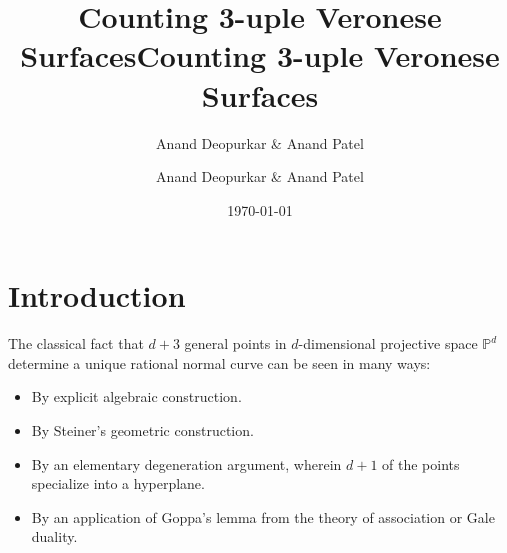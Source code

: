 \documentclass{article}
\author{Anand Deopurkar \& Anand Patel}
\title{Counting 3-uple Veronese Surfaces}
\date{\today}
\title{Counting 3-uple Veronese Surfaces}
\author{Anand Deopurkar \& Anand Patel}
\renewcommand{\P}{\mathbb{P}}
\begin{document}
\maketitle

\maketitle

\section{Introduction} 

The classical fact that $d+3$ general points
in $d$-dimensional projective space $\P^{d}$ determine a unique rational
normal curve can be seen in many ways:
\begin{itemize}
\item By explicit algebraic construction.
\item By Steiner's geometric construction.
\item By an elementary degeneration argument, wherein $d+1$ of the points specialize into a hyperplane.
\item By an application of Goppa's lemma from the theory of association or Gale duality. 
\end{itemize}
\end{document}
